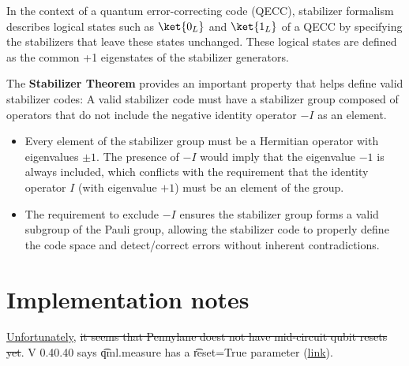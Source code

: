 \vsp

In the context of a quantum error-correcting code (QECC), stabilizer formalism describes logical
states such as \(\ket{0_L}\) and \(\ket{1_L}\) of a QECC by specifying the stabilizers that leave
these states unchanged.  These logical states are defined as the common +1 eigenstates of the
stabilizer generators.

\vsp

The \textbf{Stabilizer Theorem} provides an important property that helps define valid stabilizer
codes: A valid stabilizer code must have a stabilizer group composed of operators that do not
include the negative identity operator \(-I\) as an element.

\begin{itemize}
  \item Every element of the stabilizer group must be a Hermitian operator with eigenvalues \( \pm 1
\). The presence of \(-I\) would imply that the eigenvalue \(-1\) is always included, which
conflicts with the requirement that the identity operator \(I\) (with eigenvalue \(+1\)) must be an
element of the group.
  \item The requirement to exclude \(-I\) ensures the stabilizer group forms a valid subgroup of the
Pauli group, allowing the stabilizer code to properly define the code space and detect/correct
errors without inherent contradictions.
\end{itemize}



\section{Implementation notes}

\ls \href{https://discuss.pennylane.ai/t/how-to-reset-a-specific-qubit-to-0-during-computation/1871/17}{Unfortunately},
    \st{it seems that Pennylane doest not have mid-circuit qubit resets yet}.  V 0.40.40 says
    \t{qml.measure} has a \t{reset=True} parameter
    (\href{https://docs.pennylane.ai/en/stable/introduction/dynamic_quantum_circuits.html#conditional-operators}{link}).
\le

% 

